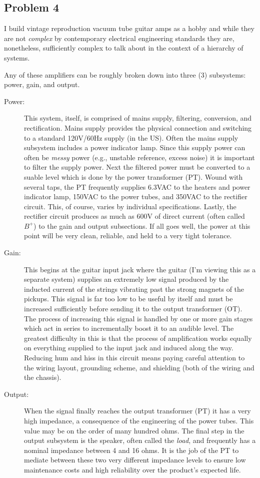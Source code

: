 \documentclass[letterpaper,10pt]{article}
\begin{document}
\subsection*{Problem 4}
I build vintage reproduction vacuum tube guitar amps as a hobby and while they  are not \emph{complex} by contemporary electrical engineering standards they are, nonetheless, sufficiently complex to talk about in the context of a hierarchy of systems.
\par Any of these amplifiers can be roughly broken down into three (3) subsystems: power, gain, and output.
\begin{description}
\item[Power:] This system, itself, is comprised of mains supply, filtering, conversion, and rectification.  Mains supply provides the physical connection and switching to a standard 120V/60Hz supply (in the US).  Often the mains supply subsystem includes a power indicator lamp.  Since this supply power can often be \emph{messy} power (e.g., unstable reference, excess noise) it is important to filter the supply power.  Next the filtered power must be converted to a suable level which is done by the power transformer (PT).  Wound with several taps, the PT frequently supplies 6.3VAC to the heaters and power indicator lamp, 150VAC to the power tubes, and 350VAC to the rectifier circuit.  This, of course, varies by individual specifications.  Lastly, the rectifier circuit produces as much as 600V of direct current (often called $B^{+}$) to the gain and output subsections.  If all goes well, the power at this point will be very clean, reliable, and held to a very tight tolerance.
\item[Gain:] This begins at the guitar input jack where the guitar (I'm viewing this as  a separate system) supplies an extremely low signal produced by the inducted current of the strings vibrating past the strong magnets of the pickups.  This signal is far too low to be useful by itself and must be increased sufficiently before sending it to the output transformer (OT).  The process of increasing this signal is handled by one or more gain stages which act in series to incrementally boost it to an audible level.  The greatest difficulty in this is that the process of amplification works equally on everything supplied to the input jack and induced along the way.  Reducing hum and hiss in this circuit means paying careful attention to the wiring layout, grounding scheme, and shielding (both of the wiring and the chassis).
\item[Output:]  When the signal finally reaches the output transformer (PT) it has a very high impedance, a consequence of the engineering of the power tubes.  This value may be on the order of many hundred ohms.  The final step in the output subsystem is the speaker, often called the \emph{load}, and frequently has a nominal impedance between 4 and 16 ohms.  It is the job of the PT to mediate between these two very different impedance levels to ensure low maintenance costs and high reliability over the product's expected life.
\end{description}
\end{document}
